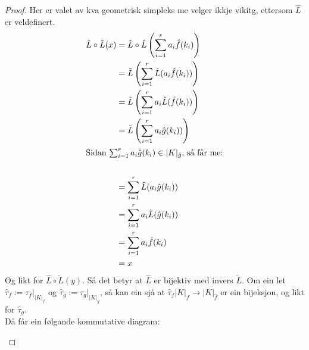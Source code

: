 \documentclass[a4paper, titlepage, 12pt, norsk]{article}
\theoremstyle{plain}
\theoremstyle{definition}
\newcommand{\Rb}{\mathbb{R}}
\newcommand{\gr}[1]{ \lvert #1 \rvert } %
\begin{document}
\begin{theroem}
\begin{proof}
	Her er valet av kva geometrisk simpleks me velger ikkje vikitg, ettersom $\hat{L}$ er veldefinert.
	\begin{align*}
		\tilde{L}\circ \hat{L}(x) &= \tilde{L}\circ \hat{L}\left(\sum_{i=1}^ra_i\hat{f}(k_i)\right) \\
		&= \tilde{L}\left(\sum_{i=1}^r\hat{L}(a_i\hat{f}(k_i))\right) \\
		&= \tilde{L}\left(\sum_{i=1}^ra_i\hat{L}(\hat{f}(k_i))\right) \\
		&= \tilde{L}\left(\sum_{i=1}^ra_i\hat{g}(k_i))\right) \\
		\intertext{Sidan $\sum_{i=1}^ra_i\hat{g}(k_i)\in\gr{K}_{\hat{g}}$, så får me:} \\
		&= \sum_{i=1}^r\tilde{L}(a_i\hat{g}(k_i)) \\
		&= \sum_{i=1}^ra_i\tilde{L}(\hat{g}(k_i)) \\
		&= \sum_{i=1}^ra_i\hat{f}(k_i) \\
		&= x
	\end{align*}
	Og likt for $\hat{L}\circ\tilde{L}(y)$.
	Så det betyr at $\hat{L}$ er bijektiv med invers $\tilde{L}$.
	Om ein let $\hat{\tau}_f:=\tau_f|_{\gr{K}_f}$ og $\hat{\tau}_g:=\tau_g|_{\gr{K}_g}$, så kan ein sjå at $\hat{\tau}_f\gr{K}_f\to\gr{K}_{\hat{f}}$ er ein bijeksjon, og likt for $\hat{\tau}_g$.
	\\Då får ein følgande kommutative diagram:
	\begin{center} %
\end{center}
\end{proof}
\end{theroem}
\end{document}
